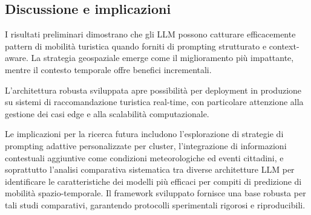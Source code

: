 
\subsection{Discussione e implicazioni}

I risultati preliminari dimostrano che gli LLM possono catturare efficacemente pattern di mobilità turistica quando forniti di prompting strutturato e context-aware. La strategia geospaziale emerge come il miglioramento più impattante, mentre il contesto temporale offre benefici incrementali.

L'architettura robusta sviluppata apre possibilità per deployment in produzione su sistemi di raccomandazione turistica real-time, con particolare attenzione alla gestione dei casi edge e alla scalabilità computazionale.

Le implicazioni per la ricerca futura includono l'esplorazione di strategie di prompting adattive personalizzate per cluster, l'integrazione di informazioni contestuali aggiuntive come condizioni meteorologiche ed eventi cittadini, e soprattutto l'analisi comparativa sistematica tra diverse architetture LLM per identificare le caratteristiche dei modelli più efficaci per compiti di predizione di mobilità spazio-temporale. Il framework sviluppato fornisce una base robusta per tali studi comparativi, garantendo protocolli sperimentali rigorosi e riproducibili.